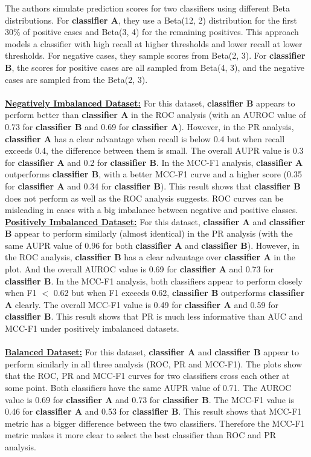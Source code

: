 \documentclass[12pt, oneside]{amsart}
\theoremstyle{definition}
\theoremstyle{remark}
\numberwithin{equation}{section}
\begin{document}
The authors simulate prediction scores for two classifiers using different Beta distributions. For \textbf{classifier A}, they use a Beta(12, 2) distribution for the first 30\% of positive cases and Beta(3, 4) for the remaining positives. This approach models a classifier with high recall at higher thresholds and lower recall at lower thresholds. For negative cases, they sample scores from Beta(2, 3). For \textbf{classifier B}, the scores for positive cases are all sampled from Beta(4, 3), and the negative cases are sampled from the Beta(2, 3). \\
\\
\underline{\textbf{Negatively Imbalanced Dataset:}}
For this dataset,  \textbf{classifier B} appears to perform better than \textbf{classifier A} in the ROC analysis (with an AUROC value of 0.73 for \textbf{classifier B} and 0.69 for \textbf{classifier A}). However, in the PR analysis, \textbf{classifier A} has a clear advantage when recall is below 0.4 but when recall exceeds 0.4, the difference between them is small. The overall AUPR value is 0.3 for \textbf{classifier A} and 0.2 for \textbf{classifier B}. In the MCC-F1 analysis, \textbf{classifier A} outperforms \textbf{classifier B}, with a better MCC-F1 curve and a higher score (0.35 for \textbf{classifier A} and 0.34 for \textbf{classifier B}). This result shows that \textbf{classifier B} does not perform as well as the ROC analysis suggests. ROC curves can be misleading in cases with a big imbalance between negative and positive classes.
\\
\underline{\textbf{Positively Imbalanced Dataset:}}
For this dataset, \textbf{classifier A} and  \textbf{classifier B} appear to perform similarly (almost identical) in the PR analysis (with the same AUPR value of 0.96 for both \textbf{classifier A} and \textbf{classifier B}). However, in the ROC analysis, \textbf{classifier B} has a clear advantage over \textbf{classifier A} in the plot. And the overall AUROC value is 0.69 for \textbf{classifier A} and 0.73 for \textbf{classifier B}. In the MCC-F1 analysis, both classifiers appear to perform closely when F1 $<$ 0.62 but when F1 exceeds 0.62, \textbf{classifier B} outperforms \textbf{classifier A} clearly.  The overall MCC-F1 value is 0.49 for \textbf{classifier A} and 0.59 for \textbf{classifier B}. This result shows that PR is much less informative than AUC and MCC-F1 under positively imbalanced datasets. \\
\\
\underline{\textbf{Balanced Dataset:}}
For this dataset, \textbf{classifier A} and \textbf{classifier B} appear to perform similarly in all three analysis (ROC, PR and MCC-F1). The plots show that the ROC, PR and MCC-F1 curves for two classifiers cross each other at some point. Both classifiers have the same AUPR value of 0.71. The AUROC value is 0.69 for \textbf{classifier A} and 0.73 for \textbf{classifier B}. The MCC-F1 value is 0.46 for \textbf{classifier A} and 0.53 for \textbf{classifier B}. This result shows that MCC-F1 metric has a bigger difference between the two classifiers.  Therefore the MCC-F1 metric makes it more clear to select the best classifier than ROC and PR analysis. \\
\end{document}
